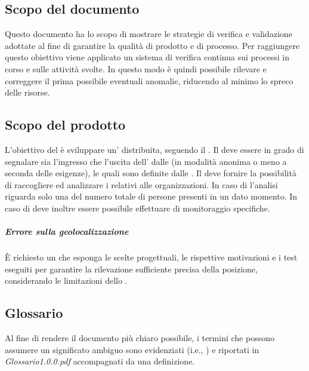 \documentclass[../piano-di-qualifica.tex]{subfiles}
\begin{document}
\subsection{Scopo del documento}%
\label{sub:scopo_del_documento}
Questo documento ha lo scopo di mostrare le strategie di verifica e validazione adottate al fine di garantire la qualità di prodotto e di processo.
Per raggiungere questo obiettivo viene applicato un sistema di verifica continua sui processi in corso e sulle attività svolte.
In questo modo è quindi possibile rilevare e correggere il prima possibile eventuali anomalie, riducendo al minimo lo spreco delle risorse.

\subsection{Scopo del prodotto}%
\label{sub:scopo_del_prodotto}
L'obiettivo del  è sviluppare un' distribuita, seguendo il .
Il  deve essere in grado di segnalare sia l'ingresso che l'uscita dell' dalle  (in modalità anonima o meno a seconda delle esigenze), le quali sono definite dalle .
Il  deve fornire la possibilità di raccogliere ed analizzare i  relativi alle organizzazioni.
In caso di  l'analisi riguarda solo una  del numero totale di persone presenti in un dato momento.
In caso di  deve inoltre essere possibile effettuare  di monitoraggio specifiche.

\subparagraph*{Errore sulla geolocalizzazione}%
\label{subp:errore_sulla_geolocalizzazione}
È richiesto un  che esponga le scelte progettuali, le rispettive motivazioni e i test eseguiti per garantire la rilevazione sufficiente precisa della posizione, considerando le limitazioni dello .
\subsection{Glossario}%
\label{sub:glossario}
Al fine di rendere il documento più chiaro possibile, i termini che possono assumere un significato ambiguo sono evidenziati (i.e., ) e riportati in \textit{Glossario1.0.0.pdf} accompagnati da una definizione.
\end{document}
